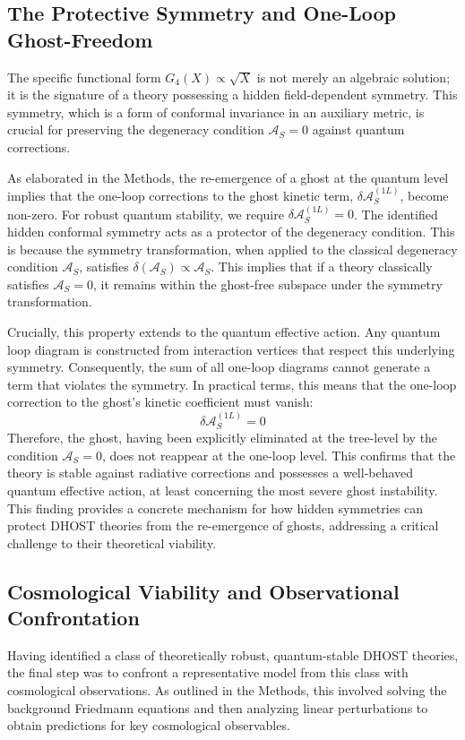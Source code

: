 \documentclass[twocolumn]{aastex631}
\begin{document}
\subsection{The Protective Symmetry and One-Loop Ghost-Freedom}
The specific functional form $G_4(X) \propto \sqrt{X}$ is not merely an algebraic solution; it is the signature of a theory possessing a hidden field-dependent symmetry. This symmetry, which is a form of conformal invariance in an auxiliary metric, is crucial for preserving the degeneracy condition $\mathcal{A}_S=0$ against quantum corrections.

As elaborated in the Methods, the re-emergence of a ghost at the quantum level implies that the one-loop corrections to the ghost kinetic term, $\delta\mathcal{A}_S^{(1L)}$, become non-zero. For robust quantum stability, we require $\delta\mathcal{A}_S^{(1L)} = 0$. The identified hidden conformal symmetry acts as a protector of the degeneracy condition. This is because the symmetry transformation, when applied to the classical degeneracy condition $\mathcal{A}_S$, satisfies $\delta(\mathcal{A}_S) \propto \mathcal{A}_S$. This implies that if a theory classically satisfies $\mathcal{A}_S=0$, it remains within the ghost-free subspace under the symmetry transformation.

Crucially, this property extends to the quantum effective action. Any quantum loop diagram is constructed from interaction vertices that respect this underlying symmetry. Consequently, the sum of all one-loop diagrams cannot generate a term that violates the symmetry. In practical terms, this means that the one-loop correction to the ghost's kinetic coefficient must vanish:
\begin{equation}
\delta\mathcal{A}_S^{(1L)} = 0
\end{equation}
Therefore, the ghost, having been explicitly eliminated at the tree-level by the condition $\mathcal{A}_S=0$, does not reappear at the one-loop level. This confirms that the theory is stable against radiative corrections and possesses a well-behaved quantum effective action, at least concerning the most severe ghost instability. This finding provides a concrete mechanism for how hidden symmetries can protect DHOST theories from the re-emergence of ghosts, addressing a critical challenge to their theoretical viability.

\subsection{Cosmological Viability and Observational Confrontation}
Having identified a class of theoretically robust, quantum-stable DHOST theories, the final step was to confront a representative model from this class with cosmological observations. As outlined in the Methods, this involved solving the background Friedmann equations and then analyzing linear perturbations to obtain predictions for key cosmological observables.
\end{document}
